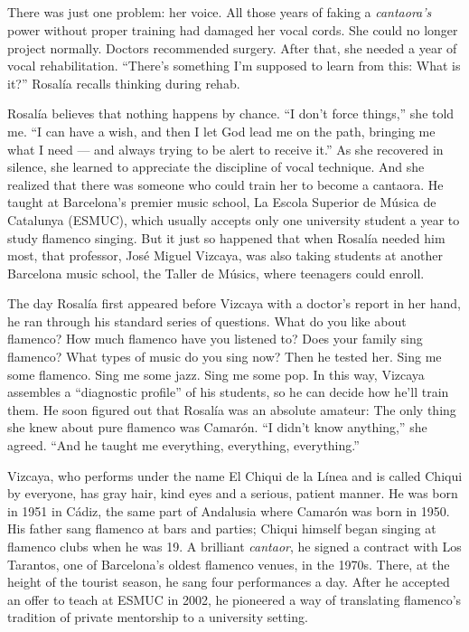 \subsection{}

There was just one problem: her voice. All those years of faking a
\emph{cantaora's} power without proper training had damaged her vocal
cords. She could no longer project normally. Doctors recommended
surgery. After that, she needed a year of vocal rehabilitation.
``There's something I'm supposed to learn from this: What is it?''
Rosalía recalls thinking during rehab.

Rosalía believes that nothing happens by chance. ``I don't force
things,'' she told me. ``I can have a wish, and then I let God lead me
on the path, bringing me what I need --- and always trying to be alert
to receive it.'' As she recovered in silence, she learned to appreciate
the discipline of vocal technique. And she realized that there was
someone who could train her to become a cantaora. He taught at
Barcelona's premier music school, La Escola Superior de Música de
Catalunya (ESMUC), which usually accepts only one university student a
year to study flamenco singing. But it just so happened that when
Rosalía needed him most, that professor, José Miguel Vizcaya, was also
taking students at another Barcelona music school, the Taller de Músics,
where teenagers could enroll.

The day Rosalía first appeared before Vizcaya with a doctor's report in
her hand, he ran through his standard series of questions. What do you
like about flamenco? How much flamenco have you listened to? Does your
family sing flamenco? What types of music do you sing now? Then he
tested her. Sing me some flamenco. Sing me some jazz. Sing me some pop.
In this way, Vizcaya assembles a ``diagnostic profile'' of his students,
so he can decide how he'll train them. He soon figured out that Rosalía
was an absolute amateur: The only thing she knew about pure flamenco was
Camarón. ``I didn't know anything,'' she agreed. ``And he taught me
everything, everything, everything.''

Vizcaya, who performs under the name El Chiqui de la Línea and is called
Chiqui by everyone, has gray hair, kind eyes and a serious, patient
manner. He was born in 1951 in Cádiz, the same part of Andalusia where
Camarón was born in 1950. His father sang flamenco at bars and parties;
Chiqui himself began singing at flamenco clubs when he was 19. A
brilliant \emph{cantaor}, he signed a contract with Los Tarantos, one of
Barcelona's oldest flamenco venues, in the 1970s. There, at the height
of the tourist season, he sang four performances a day. After he
accepted an offer to teach at ESMUC in 2002, he pioneered a way of
translating flamenco's tradition of private mentorship to a university
setting.

